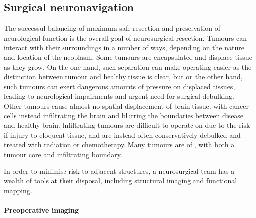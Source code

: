 
\subsection{Surgical neuronavigation}


The successul balancing of maximum safe resection and preservation of neurological function is the overall goal of neurosurgical resection.
Tumours can interact with their surroundings in a number of ways, depending on the nature and location of the neoplasm.
Some tumours are encapsulated and displace tissue as they grow.
On the one hand, such separation can make operating easier as the distinction between tumour and healthy tissue is clear, but on the other hand, such tumours can exert dangerous amounts of pressure on displaced tissues, leading to neurological impairments and urgent need for surgical debulking.
Other tumours cause almost no spatial displacement of brain tissue, with cancer cells instead infiltrating the brain and blurring the boundaries between disease and healthy brain.
Infiltrating tumours are difficult to operate on due to the risk if injury to eloquent tissue, and are instead often conservatively debulked and treated with radiation or chemotherapy.
Many tumours are of , with both a tumour core and infiltrating boundary.

In order to minimise risk to adjacent structures, a neurosurgical team has a wealth of tools at their disposal, including structural imaging and functional mapping.

\paragraph*{Preoperative imaging}

